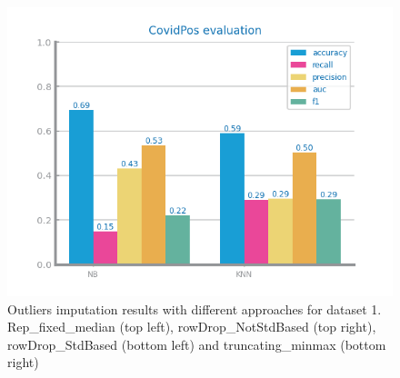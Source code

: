 \documentclass[10pt]{extarticle}
\begin{document}
\begin{figure}[H]
\includegraphics[scale=0.80]{images/dataset1/data_preparation/CovidPos_outliers_treat_truncating_minmax.png}
\caption{Outliers imputation results with different approaches for dataset 1. Rep\_fixed\_median (top left), rowDrop\_NotStdBased (top right), rowDrop\_StdBased (bottom left) and truncating\_minmax (bottom right)}
\end{figure}
\end{document}

